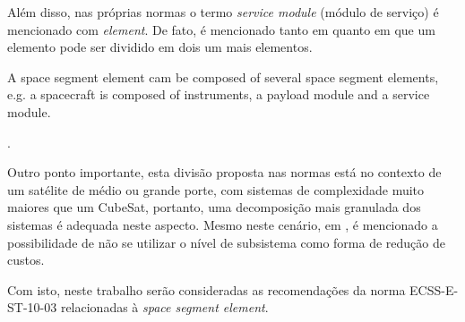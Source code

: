 Além disso, nas próprias normas o termo \textit{service module} (módulo de serviço) é mencionado com \textit{element}. De fato, é mencionado tanto em \textcite{ecss-s-st-00-01} quanto em \textcite{ecss-e-st-10-03} que um elemento pode ser dividido em dois um mais elementos.

\begin{citacao}
    A space segment element cam be composed of several space segment elements, e.g. a spacecraft is composed of instruments, a payload module and a service module. \cite[p. 10]{ecss-s-st-00-01}
\end{citacao}.

Outro ponto importante, esta divisão proposta nas normas está no contexto de um satélite de médio ou grande porte, com sistemas de complexidade muito maiores que um CubeSat, portanto, uma decomposição mais granulada dos sistemas é adequada neste aspecto.
Mesmo neste cenário, em \textcite{ecss-e-hb-10-02}, é mencionado a possibilidade de não se utilizar o nível de subsistema como forma de redução de custos.

Com isto, neste trabalho serão consideradas as recomendações da norma ECSS-E-ST-10-03 \cite{ecss-e-st-10-03} relacionadas à \textit{space segment element}.




